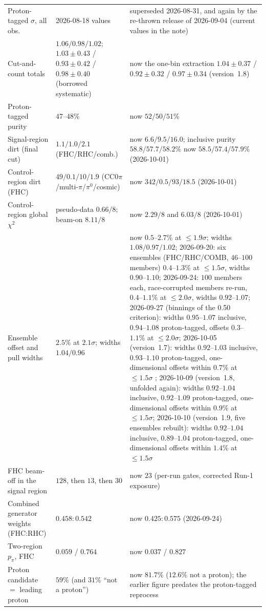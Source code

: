 \begin{center}
\begin{tabular}{p{4.3cm}p{4.2cm}p{6.4cm}}
Proton-tagged $\sigma$, all obs.    & 2026-08-18 values & superseded 2026-08-31, and again by the re-thrown release of 2026-09-04 (current values in the note) \\
Cut-and-count totals                & $1.06/0.98/1.02$; $1.03\pm0.43$ / $0.93\pm0.42$ / $0.98\pm0.40$ (borrowed systematic) & now the one-bin extraction $1.04\pm0.37$ / $0.92\pm0.32$ / $0.97\pm0.34$ (version~1.8) \\
Proton-tagged purity                & $47$--$48\%$     & now $52/50/51\%$ \\
Signal-region dirt (final cut)      & $1.1/1.0/2.1$ (FHC/RHC/comb.) & now $6.6/9.5/16.0$; inclusive purity $58.8/57.7/58.2\%$ now $58.5/57.4/57.9\%$ (2026-10-01) \\
Control-region dirt (FHC)           & $49/0.1/10/1.9$ (CC$0\pi$/multi-$\pi$/$\pi^0$/cosmic) & now $342/0.5/93/18.5$ (2026-10-01) \\
Control-region global $\chi^2$      & pseudo-data $0.66/8$; beam-on $8.11/8$ & now $2.29/8$ and $6.03/8$ (2026-10-01) \\
Ensemble offset and pull widths     & $2.5\%$ at $2.1\sigma$; widths $1.04/0.96$ & now $0.5$--$2.7\%$ at $\le1.9\sigma$; widths $1.08/0.97/1.02$; 2026-09-20: six ensembles (FHC/RHC/COMB, $46$--$100$ members) $0.4$--$1.3\%$ at $\le1.5\sigma$, widths $0.90$--$1.10$; 2026-09-24: $100$ members each, race-corrupted members re-run, $0.4$--$1.1\%$ at $\le2.0\sigma$, widths $0.92$--$1.07$; 2026-09-27 (binnings of the 0.50 criterion): widths $0.95$--$1.07$ inclusive, $0.94$--$1.08$ proton-tagged, offsets $0.3$--$1.1\%$ at $\le2.0\sigma$; 2026-10-05 (version~1.7): widths $0.92$--$1.03$ inclusive, $0.93$--$1.10$ proton-tagged, one-dimensional offsets within $0.7\%$ at $\le1.5\sigma$ ; 2026-10-09 (version~1.8, unfolded again): widths $0.92$--$1.04$ inclusive, $0.92$--$1.09$ proton-tagged, one-dimensional offsets within $0.9\%$ at $\le1.5\sigma$; 2026-10-10 (version~1.9, five ensembles rebuilt): widths $0.92$--$1.04$ inclusive, $0.89$--$1.04$ proton-tagged, one-dimensional offsets within $1.4\%$ at $\le1.5\sigma$ \\
FHC beam-off in the signal region   & $128$, then $13$, then $30$ & now $23$ (per-run gates, corrected Run-1 exposure) \\
Combined generator weights (FHC:RHC) & $0.458{:}0.542$ & now $0.425{:}0.575$ (2026-09-24) \\
Two-region $p_\pi$, FHC            & $0.059$ / $0.764$ & now $0.037$ / $0.827$ \\
Proton candidate $=$ leading proton  & $59\%$ (and $31\%$ ``not a proton'') & now $81.7\%$ ($12.6\%$ not a proton); the earlier figure predates the proton-tagged reprocess \\

\end{tabular}
\end{center}
